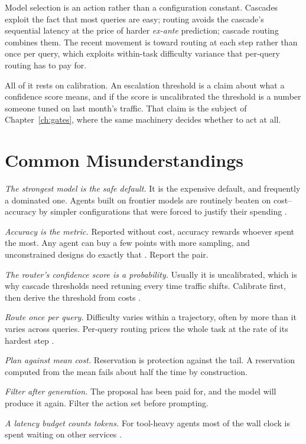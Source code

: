 \documentclass[11pt]{book}
\begin{document}
Model selection is an action rather than a configuration constant. Cascades exploit the fact that most queries are easy; routing avoids the cascade's sequential latency at the price of harder \textit{ex-ante} prediction; cascade routing combines them. The recent movement is toward routing at each step rather than once per query, which exploits within-task difficulty variance that per-query routing has to pay for.

All of it rests on calibration. An escalation threshold is a claim about what a confidence score means, and if the score is uncalibrated the threshold is a number someone tuned on last month's traffic. That claim is the subject of Chapter~\ref{ch:gates}, where the same machinery decides whether to act at all.

\section{Common Misunderstandings}

\textit{The strongest model is the safe default.} It is the expensive default, and frequently a dominated one. Agents built on frontier models are routinely beaten on cost--accuracy by simpler configurations that were forced to justify their spending \cite{kapoor2024agents}.

\textit{Accuracy is the metric.} Reported without cost, accuracy rewards whoever spent the most. Any agent can buy a few points with more sampling, and unconstrained designs do exactly that \cite{liu2025bats}. Report the pair.

\textit{The router's confidence score is a probability.} Usually it is uncalibrated, which is why cascade thresholds need retuning every time traffic shifts. Calibrate first, then derive the threshold from costs \cite{ucci2026}.

\textit{Route once per query.} Difficulty varies within a trajectory, often by more than it varies across queries. Per-query routing prices the whole task at the rate of its hardest step \cite{policyrouting2026}.

\textit{Plan against mean cost.} Reservation is protection against the tail. A reservation computed from the mean fails about half the time by construction.

\textit{Filter after generation.} The proposal has been paid for, and the model will produce it again. Filter the action set before prompting.

\textit{A latency budget counts tokens.} For tool-heavy agents most of the wall clock is spent waiting on other services \cite{timelymachine2026}.
\end{document}
